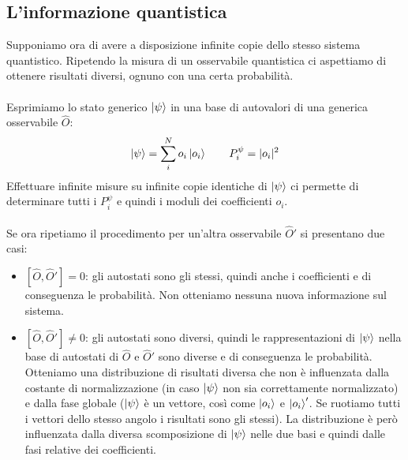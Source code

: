 \documentclass{article}
\begin{document}
\subsection{L'informazione quantistica}
Supponiamo ora di avere a disposizione infinite copie dello stesso sistema quantistico. Ripetendo la misura di un osservabile quantistica ci aspettiamo di ottenere risultati diversi, ognuno con una certa probabilità.\\\\
Esprimiamo lo stato generico $\ket{\psi}$ in una base di autovalori di una generica osservabile $\hat{O}$:
$$\ket{\psi}=\sum_i^No_i\ket{o_i} \qquad P^\psi_i=|o_i|^2$$
Effettuare infinite misure su infinite copie identiche di $\ket{\psi}$ ci permette di determinare tutti i $P_i^\psi$ e quindi i moduli dei coefficienti $o_i$.\\\\
Se ora ripetiamo il procedimento per un'altra osservabile $\hat{O}'$ si presentano due casi:
\begin{itemize}
    \item $[\hat{O},\hat{O}']=0$: gli autostati sono gli stessi, quindi anche i coefficienti e di conseguenza le probabilità. Non otteniamo nessuna nuova informazione sul sistema.

    \item $[\hat{O},\hat{O}']\neq0$: gli autostati sono diversi, quindi le rappresentazioni di $\ket{\psi}$ nella base di autostati di $\hat{O}$ e $\hat{O}'$ sono diverse e di conseguenza le probabilità. Otteniamo una distribuzione di risultati diversa che non è influenzata dalla costante di normalizzazione (in caso $\ket{\psi}$ non sia correttamente normalizzato) e dalla fase globale ($\ket{\psi}$ è un vettore, così come $\ket{o_i}$ e $\ket{o_i}'$. Se ruotiamo tutti i vettori dello stesso angolo i risultati sono gli stessi). La distribuzione è però influenzata dalla diversa scomposizione di $\ket{\psi}$ nelle due basi e quindi dalle fasi relative dei coefficienti.
\end{itemize}
\end{document}
